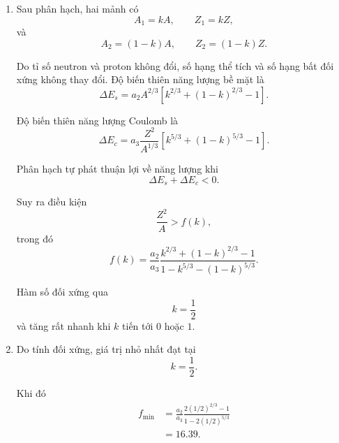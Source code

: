 \documentclass[12pt,a4paper]{article}
\begin{document}
\begin{enumerate}[leftmargin=*,itemsep=1em]
Với
$$
R^2=R_0^2A^{2/3},
$$
ta được
$$
\sigma=\frac{a_2}{4\pi R_0^2}.
$$

Đổi
$$
a_2=16.8\,\mathrm{MeV}
=16.8\times1.602\times10^{-13}\,\mathrm J,
$$
suy ra
$$
\sigma=1.5\times10^{17}\,\mathrm{N\,m^{-1}}.
$$

\item
Sau phân hạch, hai mảnh có
$$
A_1=kA,
\qquad
Z_1=kZ,
$$
và
$$
A_2=(1-k)A,
\qquad
Z_2=(1-k)Z.
$$

Do tỉ số neutron và proton không đổi, số hạng thể tích và số hạng bất đối xứng
không thay đổi. Độ biến thiên năng lượng bề mặt là
$$
\Delta E_s
=a_2A^{2/3}
\left[k^{2/3}+(1-k)^{2/3}-1\right].
$$

Độ biến thiên năng lượng Coulomb là
$$
\Delta E_c
=a_3\frac{Z^2}{A^{1/3}}
\left[k^{5/3}+(1-k)^{5/3}-1\right].
$$

Phân hạch tự phát thuận lợi về năng lượng khi
$$
\Delta E_s+\Delta E_c<0.
$$

Suy ra điều kiện
$$
\frac{Z^2}{A}>f(k),
$$
trong đó
$$
f(k)
=\frac{a_2}{a_3}
\frac{k^{2/3}+(1-k)^{2/3}-1}
{1-k^{5/3}-(1-k)^{5/3}}.
$$

Hàm số đối xứng qua
$$
k=\frac12
$$
và tăng rất nhanh khi $k$ tiến tới $0$ hoặc $1$.

\begin{center}
\end{center}

\item
Do tính đối xứng, giá trị nhỏ nhất đạt tại
$$
k=\frac12.
$$

Khi đó
$$
\begin{aligned}
f_{\min}
&=\frac{a_2}{a_3}
\frac{2(1/2)^{2/3}-1}
{1-2(1/2)^{5/3}}\\
&=16.39.
\end{aligned}
$$


\end{enumerate}
\end{document}
